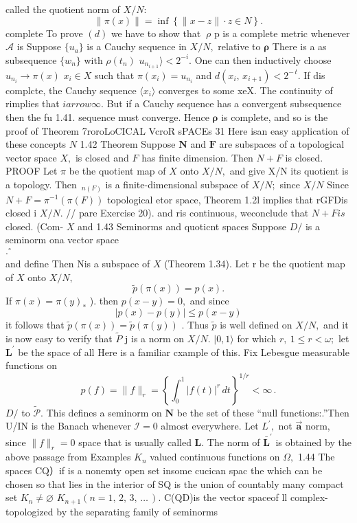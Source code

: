 called the quotient norm of $X/N\colon$ $$ \|\pi(x)\|=\operatorname*{inf}\left\{\|x-z\|\cdot z\in N\right\}. $$ complete To prove $(d)$ we have to show that $~\rho$ p is a complete metric whenever $\mathcal{A}$ is Suppose $\scriptstyle\{u_{a}\}$ is a Cauchy sequence in $X/N,$ relative to ${\boldsymbol{\rho}}$ There is a as subsequence $\scriptstyle\{w_{n}\}$ with $\rho(t_{n})$ $u_{n_{i+1}}\rangle<2^{-i}.$ One can then inductively choose $u_{n_{i}}\to\pi(x)$ $x_{i}\in X$ such that $\pi(x_{i})=u_{n_{i}}$ and $d(x_{i},\,x_{i+1})<2^{-\,t}.$ If dis complcte, the Cauchy sequence $\langle x_{i}\rangle$ converges to some xeX. The continuity of rimplies that $i arrow\infty.$ But if a Cauchy sequence has a convergent subsequence then the fu 1.41. sequence must converge. Hence ${\boldsymbol{\rho}}$ is complete, and so is the proof of Theorem 7roroLoCICAL VcroR sPACEs 31 Here isan easy application of these concepts $\textstyle N$ 1.42 Theorem Suppose ${\boldsymbol{N}}$ and ${\boldsymbol{F}}$ are subspaces of a topological vector space $X,$ is closed and ${\mathbf{}}F$ has finite dimension. Then $N+F$ is closed. PROOF Let $\textstyle\pi$ be the quotient map of $\textstyle{X}$ onto $X/N,$ and give X/N its quotient is a topology. Then $\,_{n(F)}$ is a finite-dimensional subspace of $X/N;$ since $X/N$ Since $N+F=\pi^{-1}(\pi(F))$ topological etor space, Theorem 1.2l implies that rGFDis closed i $X/N.$ // pare Exercise 20). and ris continuous, weconclude that $N+F i s$ closed. (Com- $\textstyle X$ and 1.43 Seminorms and quoticnt spaces Suppose $D\!\!\!\!/$ is a seminorm ona vector space $$ .^{\circ}\qquad\qquad\qquad\qquad\qquad\qquad\qquad\qquad\qquad\qquad\qquad\qquad\qquad\qquad\qquad\qquad\qquad\qquad\qquad\qquad\qquad\qquad\qquad\qquad\qquad\qquad\qquad\qquad\qquad\qquad\qquad\qquad\qquad\qquad(\qquad\qquad\qquad(1). $$ and define Then Nis a subspace of $\textstyle X$ (Theorem 1.34). Let r be the quotient map of $X$ onto $X/N,$ $$ \tilde{p}(\pi(x))=p(x). $$ If $\pi(x)=\pi(y)_{*}$ ). then $p(x-y)=0,$ and since $$ |p(x)-p(y)|\leq p(x-y) $$ it follows that ${\tilde{p}}(\pi(x))={\tilde{p}}(\pi(y))$ . Thus $\tilde{p}$ is well defined on $X/N,$ and it is now easy to verify that $\tilde{P}$ j is a norm on $X/N.$ $|0,1\rangle$ for which $r,\ 1\leq r<\omega;$ let ${\boldsymbol{L}}^{\prime}$ be the space of all Here is a familiar cxample of this. Fix Lebesgue measurable functions on $$ p(f)=\|f\|_{r}=\left\{\int_{0}^{1}|f(t)|^{r}\,d t\right\}^{1/r}<\infty\,. $$ $D\!\!\!\!/$ to ${\tilde{\mathcal{P}}}.$ This defines a seminorm on $\boldsymbol{N}$ be the set of these “null functions:.”Then U/IN is the Banach whenever ${\mathcal{I}}=0$ almost everywhere. Let $L^{\prime},$ not $\vec{\mathbf{a}}$ norm, since $\|f\|_{r}=0$ space that is usually called ${\boldsymbol{L}}.$ The norm of ${\bar{\boldsymbol{L}}}^{\prime}$ is obtained by the above passage from Examples $K_{n}$ valued continuous functions on $\Omega,$ 1.44 The spaces CQ）if is a nonemty open set insome cucican spac the which can be chosen so that lies in the interior of SQ is the union of countably many compact set $K_{n}\neq\varnothing$ $K_{n+1}\left(n=1,\,2,\,3,\,\ldots\,\right).$ C(QD)is the vector spaceof ll complex- topologized by the separating family of seminorms 